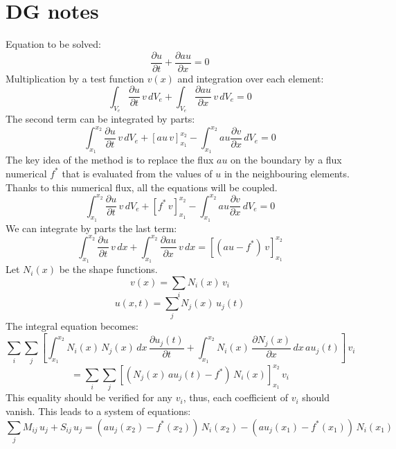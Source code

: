 \documentclass[12pt]{article}
\def\exercisename{DG notes}
\begin{document}
	
	\section*{\exercisename}


Equation to be solved:
\begin{equation*}
    \frac{\partial u}{\partial t} + \frac{\partial au}{\partial x} = 0
\end{equation*}
Multiplication by a test function $v(x)$ and integration over each element:
\begin{equation*}
	\int_{V_e} \frac{\partial u}{\partial t}\, v\, dV_e + \int_{V_e} \frac{\partial au}{\partial x}\, v\, dV_e = 0
\end{equation*}
The second term can be integrated by parts:
\begin{equation*}
	\int_{x_1}^{x_2} \frac{\partial u}{\partial t}\, v\, d{V_e} 
	+ \left[ au\,v\right]_{x_1}^{x_2}
	  - \int_{x_1}^{x_2} au \frac{\partial v}{\partial x}\, d{V_e} = 0
\end{equation*}
The key idea of the method is to replace the flux $au$ on the boundary by a flux numerical $f^*$ that is evaluated from the values of $u$ in the neighbouring elements. Thanks to this numerical flux, all the equations will be coupled.
\begin{equation*}
	\int_{x_1}^{x_2} \frac{\partial u}{\partial t}\, v\, d{V_e} 
	+ \left[ f^*\,v\right]_{x_1}^{x_2}
	- \int_{x_1}^{x_2} au \frac{\partial v}{\partial x}\, d{V_e} = 0
\end{equation*}
We can integrate by parts the last term:
\begin{equation*}
	\int_{x_1}^{x_2} \frac{\partial u}{\partial t}\, v\, dx  + \int_{x_1}^{x_2} \frac{\partial au}{\partial x}\, v\, dx
= \left[ (au - f^*)\,v\right]_{x_1}^{x_2}
\end{equation*}
Let $N_i(x)$ be the shape functions.
\begin{equation*}
	v(x) = \sum_i N_i(x)\, v_i
\end{equation*}
\begin{equation*}
	u(x,t) = \sum_j N_j(x)\, u_j(t)
\end{equation*}
The integral equation becomes:
\begin{equation*}
	\sum_i \sum_j 
	\left[ 
	\int_{x_1}^{x_2} N_i(x)\,N_j(x)\, dx\, \frac{\partial u_j(t)}{\partial t}
	+
	\int_{x_1}^{x_2} N_i(x)\,\frac{\partial N_j(x)}{\partial x}\, dx\,  au_j(t)
	\right]
	\, v_i 
\end{equation*}
\begin{equation*}
	= \sum_i \sum_j 
	\left[ 
		\left( N_j(x)\,au_j(t) - f^{*}\right)\,N_i(x)
	\right]_{x_1}^{x_2}
	\, v_i 
\end{equation*}
This equality should be verified for any $v_i$, thus, each coefficient of $v_i$ should vanish. This leads to a system of equations:
\begin{equation*}
 \sum_j M_{ij}\, u_j + S_{ij}\,u_j 
 = 
 (au_j(x_2)-f^*(x_2))\,N_i(x_2) - (au_j(x_1)-f^*(x_1))\,N_i(x_1)
\end{equation*}
\end{document}
